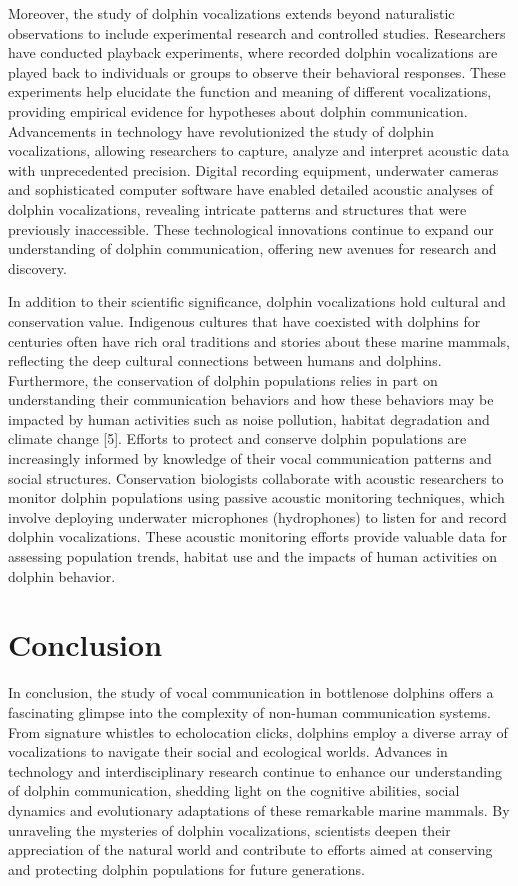 \documentclass{article}
\begin{document}
\begin{multicols}{2}
Moreover, the study of dolphin vocalizations extends beyond naturalistic observations to include experimental research and controlled studies. Researchers have conducted playback experiments, where recorded dolphin vocalizations are played back to individuals or groups to observe their behavioral responses. These experiments help elucidate the function and meaning of different vocalizations, providing empirical evidence for hypotheses about dolphin communication. Advancements in technology have revolutionized the study of dolphin vocalizations, allowing researchers to capture, analyze and interpret acoustic data with unprecedented precision. Digital recording equipment, underwater cameras and sophisticated computer software have enabled detailed acoustic analyses of dolphin vocalizations, revealing intricate patterns and structures that were previously inaccessible. These technological innovations continue to expand our understanding of dolphin communication, offering new avenues for research and discovery.

In addition to their scientific significance, dolphin vocalizations hold cultural and conservation value. Indigenous cultures that have coexisted with dolphins for centuries often have rich oral traditions and stories about these marine mammals, reflecting the deep cultural connections between humans and dolphins. Furthermore, the conservation of dolphin populations relies in part on understanding their communication behaviors and how these behaviors may be impacted by human activities such as noise pollution, habitat degradation and climate change [5]. Efforts to protect and conserve dolphin populations are increasingly informed by knowledge of their vocal communication patterns and social structures. Conservation biologists collaborate with acoustic researchers to monitor dolphin populations using passive acoustic monitoring techniques, which involve deploying underwater microphones (hydrophones) to listen for and record dolphin vocalizations. These acoustic monitoring efforts provide valuable data for assessing population trends, habitat use and the impacts of human activities on dolphin behavior.

\section*{\color{color_100238}Conclusion}
In conclusion, the study of vocal communication in bottlenose dolphins offers a fascinating glimpse into the complexity of non-human communication systems. From signature whistles to echolocation clicks, dolphins employ a diverse array of vocalizations to navigate their social and ecological worlds. Advances in technology and interdisciplinary research continue to enhance our understanding of dolphin communication, shedding light on the cognitive abilities, social dynamics and evolutionary adaptations of these remarkable marine mammals. By unraveling the mysteries of dolphin vocalizations, scientists deepen their appreciation of the natural world and contribute to efforts aimed at conserving and protecting dolphin populations for future generations.


\end{multicols}
\end{document}
